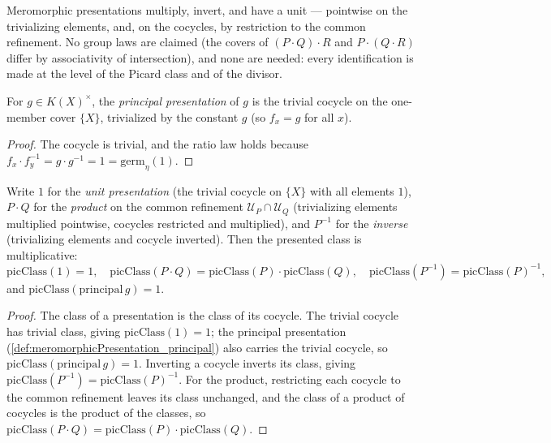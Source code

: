 Meromorphic presentations multiply, invert, and have a unit --- pointwise on the trivializing
elements, and, on the cocycles, by restriction to the common refinement. No group laws are
claimed (the covers of \((P \cdot Q) \cdot R\) and \(P \cdot (Q \cdot R)\) differ by
associativity of intersection), and none are needed: every identification is made at the level of
the Picard class and of the divisor.

\begin{definition}
  \label{def:meromorphicPresentation_principal}
  \leanok
  For \(g \in K(X)^{\times}\), the \emph{principal presentation} of \(g\) is the trivial cocycle on
  the one-member cover \(\{X\}\), trivialized by the constant \(g\) (so \(f_x = g\) for all
  \(x\)).
\end{definition}
\begin{proof}
  \leanok
  The cocycle is trivial, and the ratio law holds because \(f_x \cdot f_y^{-1} = g \cdot g^{-1} =
  1 = \mathrm{germ}_\eta(1)\).
\end{proof}

\begin{theorem}
  \label{thm:meromorphicPresentation_picClass_hom}
  \leanok
  Write \(1\) for the \emph{unit presentation} (the trivial cocycle on \(\{X\}\) with all elements
  \(1\)), \(P \cdot Q\) for the \emph{product} on the common refinement \(\mathcal U_P \cap
  \mathcal U_Q\) (trivializing elements multiplied pointwise, cocycles restricted and multiplied),
  and \(P^{-1}\) for the \emph{inverse} (trivializing elements and cocycle inverted). Then the
  presented class is multiplicative:
  \[
    \mathrm{picClass}(1) = 1, \quad \mathrm{picClass}(P \cdot Q) = \mathrm{picClass}(P) \cdot
      \mathrm{picClass}(Q), \quad \mathrm{picClass}(P^{-1}) = \mathrm{picClass}(P)^{-1},
  \]
  and \(\mathrm{picClass}(\mathrm{principal}\, g) = 1\).
\end{theorem}
\begin{proof}
  \leanok
  The class of a presentation is the class of its cocycle. The trivial cocycle has trivial class,
  giving \(\mathrm{picClass}(1) = 1\); the principal presentation
  (\ref{def:meromorphicPresentation_principal}) also carries the trivial cocycle, so
  \(\mathrm{picClass}(\mathrm{principal}\, g) = 1\). Inverting a cocycle inverts its class,
  giving \(\mathrm{picClass}(P^{-1}) = \mathrm{picClass}(P)^{-1}\). For the product, restricting
  each cocycle to the common refinement leaves its class unchanged, and the class of a product of
  cocycles is the product of the classes, so \(\mathrm{picClass}(P \cdot Q) = \mathrm{picClass}(P)
  \cdot \mathrm{picClass}(Q)\).
\end{proof}


